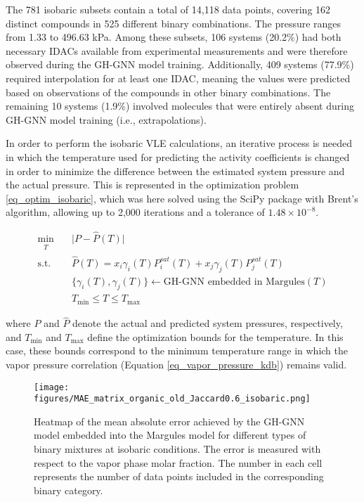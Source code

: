 The 781 isobaric subsets contain a total of 14,118 data points, covering 162 distinct compounds in 525 different binary combinations. The pressure ranges from 1.33 to 496.63 kPa. Among these subsets, 106 systems (20.2\%) had both necessary IDACs available from experimental measurements and were therefore observed during the GH-GNN model training. Additionally, 409 systems (77.9\%) required interpolation for at least one IDAC, meaning the values were predicted based on observations of the compounds in other binary combinations. The remaining 10 systems (1.9\%) involved molecules that were entirely absent during GH-GNN model training (i.e., extrapolations).

In order to perform the isobaric VLE calculations, an iterative process is needed in which the temperature used for predicting the activity coefficients is changed in order to minimize the difference between the estimated system pressure and the actual pressure. This is represented in the optimization problem \ref{eq_optim_isobaric}, which was here solved using the SciPy package \cite{virtanen2020scipy} with Brent's algorithm, allowing up to 2,000 iterations and a tolerance of $1.48 \times 10^{-8}$.

\begin{equation}
\begin{aligned}
\underset{\substack{T}}{\text{min}} \quad & \vert P - \hat{P}(T) \vert \\
\text{s.t.} \quad & \hat{P}(T) = x_i \gamma_i(T) P_i^{sat}(T) + x_j \gamma_j(T) P_j^{sat}(T) \\
& \{\gamma_i(T), \gamma_j(T)\} \leftarrow \text{GH-GNN embedded in Margules}(T)\\
& T_{\min} \leq T \leq T_{\max}
\end{aligned}
\label{eq_optim_isobaric}
\end{equation}

\noindent where $P$ and $\hat{P}$ denote the actual and predicted system pressures, respectively, and $T_{\min}$ and $T_{\max}$ define the optimization bounds for the temperature. In this case, these bounds correspond to the minimum temperature range in which the vapor pressure correlation (Equation \ref{eq_vapor_pressure_kdb}) remains valid.

\begin{figure}[h!]
    \centering
    \texttt{[image: figures/MAE\_matrix\_organic\_old\_Jaccard0.6\_isobaric.png]}
    \caption{Heatmap of the mean absolute error achieved by the GH-GNN model embedded into the Margules model for different types of binary mixtures at isobaric conditions. The error is measured with respect to the vapor phase molar fraction. The number in each cell represents the number of data points included in the corresponding binary category.}
    \label{fig:isobaric_map}
\end{figure}

